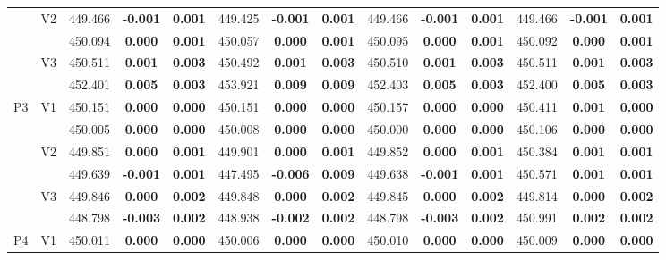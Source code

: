\documentclass[11pt,a4paper]{article}
\begin{document}
{\begin{sidewaystable}[H]
{\begin{tabular}{cc|ccc|ccc|ccc|ccc|}
   & \multirow{2}{*}{V2} & 449.466 & \textbf{-0.001} & \textbf{0.001} & 449.425 & \textbf{-0.001} & \textbf{0.001} & 449.466 & \textbf{-0.001} & \textbf{0.001} & 449.466 & \textbf{-0.001} & \textbf{0.001} \\ 
   &  & 450.094 & \textbf{0.000} & \textbf{0.001} & 450.057 & \textbf{0.000} & \textbf{0.001} & 450.095 & \textbf{0.000} & \textbf{0.001} & 450.092 & \textbf{0.000} & \textbf{0.001} \\ 
   & \multirow{2}{*}{V3} & 450.511 & \textbf{0.001} & \textbf{0.003} & 450.492 & \textbf{0.001} & \textbf{0.003} & 450.510 & \textbf{0.001} & \textbf{0.003} & 450.511 & \textbf{0.001} & \textbf{0.003} \\ 
   &  & 452.401 & \textbf{0.005} & \textbf{0.003} & 453.921 & \textbf{0.009} & \textbf{0.009} & 452.403 & \textbf{0.005} & \textbf{0.003} & 452.400 & \textbf{0.005} & \textbf{0.003} \\ 
   \hline \hline\multirow{6}{*}{P3} & \multirow{2}{*}{V1} & 450.151 & \textbf{0.000} & \textbf{0.000} & 450.151 & \textbf{0.000} & \textbf{0.000} & 450.157 & \textbf{0.000} & \textbf{0.000} & 450.411 & \textbf{0.001} & \textbf{0.000} \\ 
   &  & 450.005 & \textbf{0.000} & \textbf{0.000} & 450.008 & \textbf{0.000} & \textbf{0.000} & 450.000 & \textbf{0.000} & \textbf{0.000} & 450.106 & \textbf{0.000} & \textbf{0.000} \\ 
   & \multirow{2}{*}{V2} & 449.851 & \textbf{0.000} & \textbf{0.001} & 449.901 & \textbf{0.000} & \textbf{0.001} & 449.852 & \textbf{0.000} & \textbf{0.001} & 450.384 & \textbf{0.001} & \textbf{0.001} \\ 
   &  & 449.639 & \textbf{-0.001} & \textbf{0.001} & 447.495 & \textbf{-0.006} & \textbf{0.009} & 449.638 & \textbf{-0.001} & \textbf{0.001} & 450.571 & \textbf{0.001} & \textbf{0.001} \\ 
   & \multirow{2}{*}{V3} & 449.846 & \textbf{0.000} & \textbf{0.002} & 449.848 & \textbf{0.000} & \textbf{0.002} & 449.845 & \textbf{0.000} & \textbf{0.002} & 449.814 & \textbf{0.000} & \textbf{0.002} \\ 
   &  & 448.798 & \textbf{-0.003} & \textbf{0.002} & 448.938 & \textbf{-0.002} & \textbf{0.002} & 448.798 & \textbf{-0.003} & \textbf{0.002} & 450.991 & \textbf{0.002} & \textbf{0.002} \\ 
   \hline \hline\multirow{6}{*}{P4} & \multirow{2}{*}{V1} & 450.011 & \textbf{0.000} & \textbf{0.000} & 450.006 & \textbf{0.000} & \textbf{0.000} & 450.010 & \textbf{0.000} & \textbf{0.000} & 450.009 & \textbf{0.000} & \textbf{0.000} \\ 

\end{tabular}}
\end{sidewaystable}}
\end{document}
